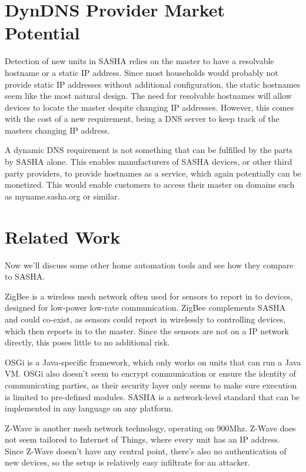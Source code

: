 \section{DynDNS Provider Market Potential}
Detection of new units in SASHA relies on the master to have a resolvable hostname or a static IP address. Since most households would probably not provide static IP addresses without additional configuration, the static hostnames seem like the most natural design.
The need for resolvable hostnames will allow devices to locate the master despite changing IP addresses. However, this comes with the cost of a new requirement, being a DNS server to keep track of the masters changing IP address.

A dynamic DNS requirement is not something that can be fulfilled by the parts by SASHA alone. This enables manufacturers of SASHA devices, or other third party providers, to provide hostnames as a service, which again potentially can be monetized. This would enable customers to access their master on domains such as myname.sasha.org or similar.

\section{Related Work}

Now we'll discuss some other home automation tools and see how they compare to SASHA.

ZigBee\cite{zigbee} is a wireless mesh network often used for sensors to report in to devices, designed for low-power low-rate communication. ZigBee complements SASHA and could co-exist, as sensors could report in wirelessly to controlling devices, which then reports in to the master. Since the sensors are not on a IP network directly, this poses little to no additional risk.

OSGi\cite{osgi} is a Java-specific framework, which only works on units that can run a Java VM. OSGi also doesn't seem to encrypt communication or ensure the identity of communicating parties, as their security layer only seems to make sure execution is limited to pre-defined modules. SASHA is a network-level standard that can be implemented in any language on any platform.

Z-Wave\cite{z-wave} is another mesh network technology, operating on 900Mhz. Z-Wave does not seem tailored to Internet of Things, where every unit has an IP address. Since Z-Wave doesn't have any central point, there's also no authentication of new devices, so the setup is relatively easy infiltrate for an attacker.

